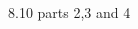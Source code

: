 




\homeworkheader{\classnameandsection}

\begin{problem}{8.4}
\end{problem}

\begin{problem}{8.6}
\end{problem}

\begin{problem}{8.10 parts 2,3 and 4}
\end{problem}

\begin{problem}{12.2}
\end{problem}

\begin{problem}{12.4}
\end{problem}

\begin{problem}{12.6}
\end{problem}



